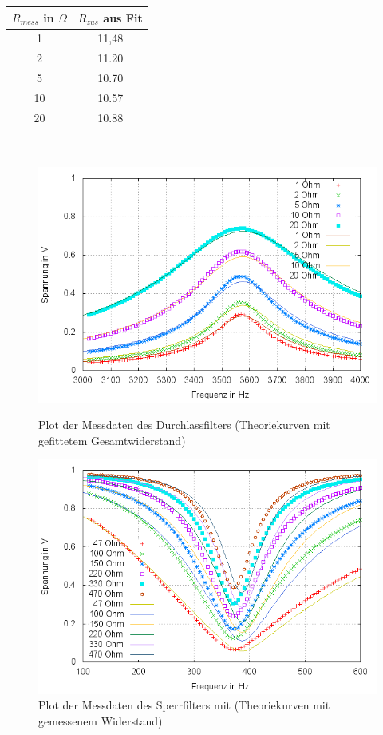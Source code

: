 \begin{table}
\centering
\begin{tabular}{cc}
$R_{mess}$ in $\Omega$ & $R_{zus}$ aus Fit \\
\hline 
1 & 11,48 \\ 
2 & 11.20 \\ 
5 & 10.70 \\ 
10 & 10.57 \\  
20 & 10.88 \\ 
\hline
\end{tabular}
\
\end{table}
\begin{figure}
	\includegraphics[width=.9\textwidth]{images/plot/durchlassfilter+theorie+R_ges-fit.png}
\caption{Plot der Messdaten des Durchlassfilters (Theoriekurven mit gefittetem Gesamtwiderstand)}
\label{plot:durchlass+R_ges-fit}

        \includegraphics[width=.9\textwidth]{images/plot/Sperrfilter-mit-Theoriekurven-mit-R_L.png}
\caption{Plot der Messdaten des Sperrfilters mit (Theoriekurven mit gemessenem Widerstand)}
\label{plot:sperr}
\end{figure}


